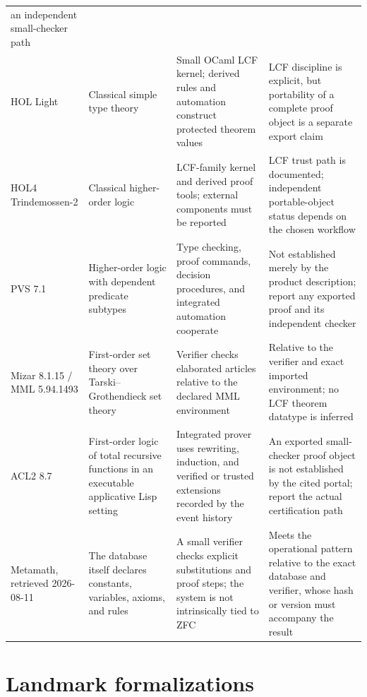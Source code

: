 \begin{landscape}
\begin{longtable}{@{}p{1.00in}p{1.85in}p{2.10in}p{2.15in}@{}}
an independent small-checker path \cite{AgdaReference2026} \\ \addlinespace
HOL Light & Classical simple type theory & Small OCaml LCF kernel; derived
rules and automation construct protected theorem values & LCF discipline is
explicit, but portability of a complete proof object is a separate export
claim \cite{HOLLightSite2026} \\ \addlinespace
HOL4 Trindemossen-2 & Classical higher-order logic & LCF-family kernel and
derived proof tools; external components must be reported & LCF trust path is
documented; independent portable-object status depends on the chosen workflow
\cite{HOL4Site2026} \\ \addlinespace
PVS 7.1 & Higher-order logic with dependent predicate subtypes & Type checking,
proof commands, decision procedures, and integrated automation cooperate &
Not established merely by the product description; report any exported proof
and its independent checker \cite{PVS71Documentation} \\ \addlinespace
Mizar 8.1.15 / MML 5.94.1493 & First-order set theory over
Tarski--Grothendieck set theory & Verifier checks elaborated articles relative
to the declared MML environment & Relative to the verifier and exact imported
environment; no LCF theorem datatype is inferred
\cite{MizarLibrary2026} \\ \addlinespace
ACL2 8.7 & First-order logic of total recursive functions in an executable
applicative Lisp setting & Integrated prover uses rewriting, induction, and
verified or trusted extensions recorded by the event history & An exported
small-checker proof object is not established by the cited portal; report the
actual certification path \cite{ACL2Documentation2026} \\ \addlinespace
Metamath, retrieved 2026-08-11 & The database itself declares constants,
variables, axioms, and rules & A small verifier checks explicit substitutions
and proof steps; the system is not intrinsically tied to ZFC & Meets the
operational pattern relative to the exact database and verifier, whose hash or
version must accompany the result \cite{MetamathSite2026} \\
\bottomrule
\end{longtable}
\endgroup
\end{landscape}

\section{Landmark formalizations}

